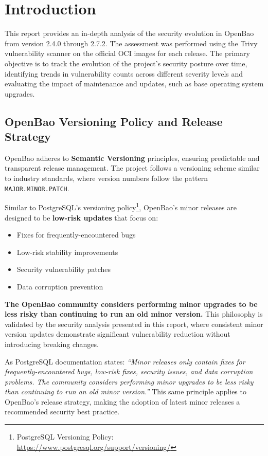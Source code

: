 \documentclass{article}
\begin{document}
\clearpage

\section{Introduction}
This report provides an in-depth analysis of the security evolution in OpenBao from version 2.4.0 through 2.7.2. The assessment was performed using the Trivy vulnerability scanner on the official OCI images for each release. The primary objective is to track the evolution of the project's security posture over time, identifying trends in vulnerability counts across different severity levels and evaluating the impact of maintenance and updates, such as base operating system upgrades.

\subsection{OpenBao Versioning Policy and Release Strategy}
OpenBao adheres to \textbf{Semantic Versioning} principles, ensuring predictable and transparent release management. The project follows a versioning scheme similar to industry standards, where version numbers follow the pattern \texttt{MAJOR.MINOR.PATCH}.

Similar to PostgreSQL's versioning policy\footnote{PostgreSQL Versioning Policy: \url{https://www.postgresql.org/support/versioning/}}, OpenBao's minor releases are designed to be \textbf{low-risk updates} that focus on:

\begin{itemize}
    \item Fixes for frequently-encountered bugs
    \item Low-risk stability improvements
    \item Security vulnerability patches
    \item Data corruption prevention
\end{itemize}

\textbf{The OpenBao community considers performing minor upgrades to be less risky than continuing to run an old minor version.} This philosophy is validated by the security analysis presented in this report, where consistent minor version updates demonstrate significant vulnerability reduction without introducing breaking changes.

As PostgreSQL documentation states: \textit{``Minor releases only contain fixes for frequently-encountered bugs, low-risk fixes, security issues, and data corruption problems. The community considers performing minor upgrades to be less risky than continuing to run an old minor version.''} This same principle applies to OpenBao's release strategy, making the adoption of latest minor releases a recommended security best practice.
\end{document}

